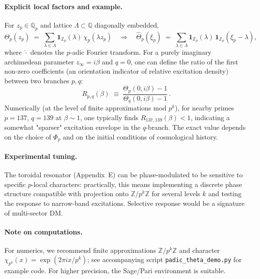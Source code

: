 \paragraph{Explicit local factors and example.}
For $z_p\!\in\!\mathbb{Q}_p$ and lattice $\Lambda\!\subset\!\mathbb{Q}$ diagonally embedded,
\begin{equation}
\Theta_p(z_p) \;=\; \sum_{\lambda\in\Lambda} \mathbf{1}_{\mathbb{Z}_p}(\lambda)\,\chi_p(\lambda z_p)
\quad\Rightarrow\quad
\widehat{\Theta}_p(\xi_p) \;=\; \sum_{\lambda\in\Lambda} \mathbf{1}_{\mathbb{Z}_p}(\lambda)\,\mathbf{1}_{\mathbb{Z}_p}(\xi_p-\lambda),
\end{equation}
where $\widehat{\cdot}$ denotes the $p$-adic Fourier transform. For a purely imaginary archimedean parameter $z_\infty=i\beta$ and $q=0$, one can define
the ratio of the first non-zero coefficients (an orientation indicator of relative excitation density) between two branches $p,q$:
\begin{equation}
R_{p,q}(\beta) \;\equiv\; \frac{\Theta_p(0,i\beta)-1}{\Theta_q(0,i\beta)-1}\,.
\end{equation}
Numerically (at the level of finite approximations mod $p^k$), for nearby primes $p=137$, $q=139$ at $\beta\!\sim\!1$, one typically finds $R_{137,139}(\beta)<1$,
indicating a somewhat "sparser" excitation envelope in the $q$-branch. The exact value depends on the choice of $\Phi_p$ and on the initial conditions of cosmological history.

\paragraph{Experimental tuning.}
The toroidal resonator (Appendix~E) can be phase-modulated to be sensitive to specific $p$-local characters: practically, this means implementing
a discrete phase structure compatible with projection onto $\mathbb{Z}/p^k\mathbb{Z}$ for several levels $k$ and testing the response to narrow-band excitations.
Selective response would be a signature of multi-sector DM.

\paragraph{Note on computations.}
For numerics, we recommend finite approximations $\mathbb{Z}/p^k\mathbb{Z}$ and character $\chi_{p^k}(x)=\exp(2\pi i x/p^k)$; see accompanying script
\texttt{padic\_theta\_demo.py} for example code. For higher precision, the Sage/Pari environment is suitable.



